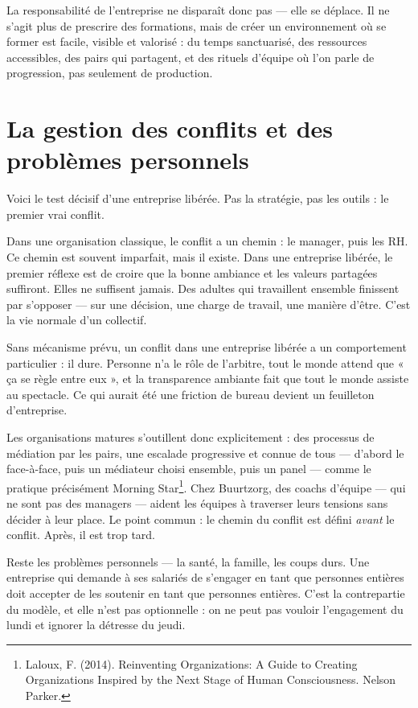 La responsabilité de l'entreprise ne disparaît donc pas — elle se déplace. Il ne s'agit plus de prescrire des formations, mais de créer un environnement où se former est facile, visible et valorisé : du temps sanctuarisé, des ressources accessibles, des pairs qui partagent, et des rituels d'équipe où l'on parle de progression, pas seulement de production.

\section{La gestion des conflits et des problèmes personnels}

Voici le test décisif d'une entreprise libérée. Pas la stratégie, pas les outils : le premier vrai conflit.

Dans une organisation classique, le conflit a un chemin : le manager, puis les RH. Ce chemin est souvent imparfait, mais il existe. Dans une entreprise libérée, le premier réflexe est de croire que la bonne ambiance et les valeurs partagées suffiront. Elles ne suffisent jamais. Des adultes qui travaillent ensemble finissent par s'opposer — sur une décision, une charge de travail, une manière d'être. C'est la vie normale d'un collectif.

Sans mécanisme prévu, un conflit dans une entreprise libérée a un comportement particulier : il dure. Personne n'a le rôle de l'arbitre, tout le monde attend que « ça se règle entre eux », et la transparence ambiante fait que tout le monde assiste au spectacle. Ce qui aurait été une friction de bureau devient un feuilleton d'entreprise.

Les organisations matures s'outillent donc explicitement : des processus de médiation par les pairs, une escalade progressive et connue de tous — d'abord le face-à-face, puis un médiateur choisi ensemble, puis un panel — comme le pratique précisément Morning Star\footnote{Laloux, F. (2014). Reinventing Organizations: A Guide to Creating Organizations Inspired by the Next Stage of Human Consciousness. Nelson Parker.}. Chez Buurtzorg, des coachs d'équipe — qui ne sont pas des managers — aident les équipes à traverser leurs tensions sans décider à leur place. Le point commun : le chemin du conflit est défini \emph{avant} le conflit. Après, il est trop tard.

Reste les problèmes personnels — la santé, la famille, les coups durs. Une entreprise qui demande à ses salariés de s'engager en tant que personnes entières doit accepter de les soutenir en tant que personnes entières. C'est la contrepartie du modèle, et elle n'est pas optionnelle : on ne peut pas vouloir l'engagement du lundi et ignorer la détresse du jeudi.

